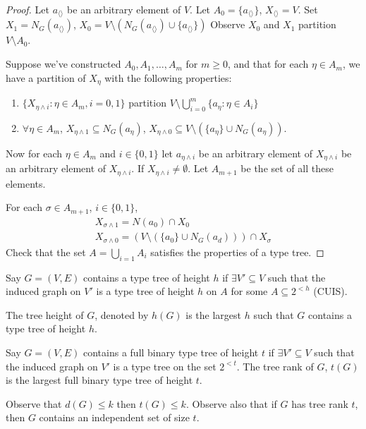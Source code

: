 \documentclass{article}
\begin{document}
\begin{proof}

  Let $a_{\langle \rangle}$ be an arbitrary element of $V$.
  Let $A_0 = \{a_{\langle\rangle}\}$, $X_{\langle\rangle} = V$.
  Set $X_1 = N_G(a_{\langle \rangle})$, $X_0 = V \setminus (N_G(a_{\langle\rangle}) \cup \{a_{\langle\rangle}\})$
  Observe $X_0$ and $X_1$ partition $V \setminus A_0$.

  Suppose we've constructed $A_0, A_1, \dotsc, A_m$ for $m \geq 0$, and that for each $\eta \in A_m$, we have a partition of $X_\eta$ with the following properties:
  \begin{enumerate}
    \item $\{X_{\eta \wedge i}: \eta \in A_m, i=0,1\}$ partition $V \setminus \bigcup_{i=0}^m \{a_\eta : \eta \in A_i\}$
    \item $\forall \eta \in A_m$, $X_{\eta \wedge 1} \subseteq N_G(a_\eta)$, $X_{\eta \wedge 0} \subseteq V \setminus (\{a_\eta\} \cup N_G(a_\eta)).$
  \end{enumerate}

  Now for each $\eta \in A_m$ and $i \in \{0,1\}$ let $a_{\eta \wedge i}$ be an arbitrary element of $X_{\eta \wedge i}$ be an arbitrary element of $X_{\eta \wedge i}$. If $X_{\eta \wedge i} \neq \emptyset$. Let $A_{m+1}$ be the set of all these elements.

  For each $\sigma \in A_{m+1}$, $i \in \{0,1\}$,
  \begin{align*}
    X_{\sigma \wedge 1} = N(a_0) \cap X_0 \\
    X_{\sigma \wedge 0} = (V \setminus (\{a_0\} \cup N_G(a_d))) \cap X_\sigma
  \end{align*}
  Check that the set $A = \bigcup_{i=1} A_i$ satisfies the properties of a type tree.
\end{proof}
\begin{defi}
  Say $G=(V,E)$ contains a type tree of height $h$ if $\exists V' \subseteq V$ such that the induced graph on $V'$ is a type tree of height $h$ on $A$ for some $A \subseteq 2^{<h}$ (CUIS).

  The tree height of $G$, denoted by $h(G)$ is the largest $h$ such that $G$ contains a type tree of height $h$.
\end{defi}
\begin{defi}
  Say $G = (V,E)$ contains a full binary type tree of height $t$ if $\exists V' \subseteq V$ such that the induced graph on $V'$ is a type tree on the set $2^{<t}$.
  The tree rank of $G$, $t(G)$ is the largest full binary type tree of height $t$.
\end{defi}
Observe that $d(G) \leq k$ then $t(G) \leq k$.
Observe also that if $G$ has tree rank $t$, then $G$ contains an independent set of size $t$.
\end{document}
